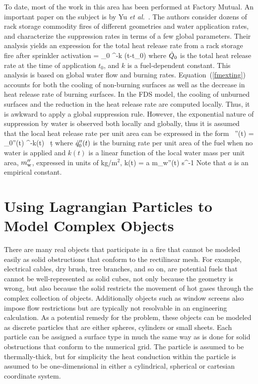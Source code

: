 To date, most of the work in this area has been performed at Factory Mutual. An important paper on the subject is by Yu {\em et al.}~\cite{Yu:1}. The authors consider dozens of rack storage commodity fires of different geometries and water application rates, and characterize the suppression rates in terms of a few global parameters. Their analysis yields an expression for the total heat release rate from a rack storage fire after sprinkler activation
\be 
   \dQ = \dQ_0 \; ^{-k (t-t_0)}  \label{fmexting}
\ee
where $\dot{Q}_0$ is the total heat release rate at the time of application $t_0$, and $k$ is a fuel-dependent constant. This analysis is based on global water flow and burning rates. Equation~(\ref{fmexting}) accounts for both the cooling of non-burning surfaces as well as the decrease in heat release rate of burning surfaces. In the FDS model, the cooling of unburned surfaces and the reduction in the heat release rate are computed locally. Thus, it is awkward to apply a global suppression rule. However, the exponential nature of suppression by water is observed both locally and globally, thus it is assumed that the local heat release rate per unit area can be expressed in the form~\cite{Hamins:1,Hamins:IAFSS2002}
\be 
   \dq''(t) = \dq_0''(t) \; ^{-\int k(t) \, \d t}
\label{nistexting} \ee
where $\dot{q}_0''(t)$ is the burning rate per unit area of the fuel when no water is applied and $k(t)$ is a linear function of the local water mass per unit area, $m_{\rm w}''$, expressed in units of kg/m$^2$,
\be 
   k(t) = a \; m_{\rm w}''(t) \quad   \hbox{s}^{-1} 
\ee
Note that $a$ is an empirical constant.



\section{Using Lagrangian Particles to Model Complex Objects}

There are many real objects that participate in a fire that cannot be modeled easily as solid obstructions that conform
to the rectilinear mesh. For example, electrical cables, dry brush, tree branches, and so on, are potential fuels that cannot
be well-represented as solid cubes, not only because the geometry is wrong, but also because the solid restricts the
movement of hot gases through the complex collection of objects.  Additionally objects such as window screens also impose flow restrictions but are typically not resolvable in an engineering calculation. As a potential remedy for the problem, these objects can
be modeled as discrete particles that are either spheres, cylinders or small sheets. Each particle can be assigned a surface
type in much the same way as is done for solid obstructions that conform to the numerical grid. The particle is assumed to be
thermally-thick, but for simplicity the heat conduction within the particle is assumed to be one-dimensional in either
a cylindrical, spherical or cartesian coordinate system.

